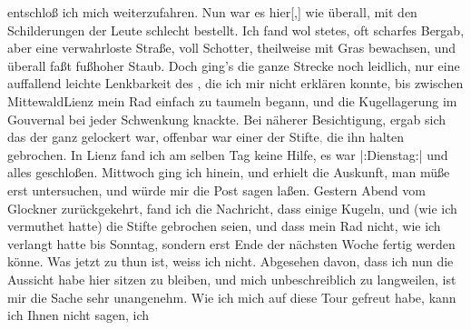                entschloß ich mich weiterzufahren. Nun war es hier{[},{]}{ }{\pb}wie überall, mit den
               Schilderungen der Leute schlecht bestellt. Ich fand wol stetes, oft scharfes Bergab,
               aber eine verwahrloste Straße, voll Schotter, theilweise mit Gras bewachsen, und
               überall faßt fußhoher Staub. Doch ging’s die ganze Strecke noch leidlich, nur eine
               auffallend leichte Lenkbarkeit des \label{K_L03128-2v}\label{K_L03128-2}, die
               ich mir nicht erklären konnte, bis zwischen MittewaldLienz mein Rad einfach zu taumeln begann, und die
               Kugellagerung im Gouvernal bei jeder Schwenkung knackte. Bei näherer Besichtigung,
               ergab sich das der \label{K_L03128-3v}\label{K_L03128-3} ganz gelockert
               war, offenbar war einer der Stifte\textcolor{gray}{,} die ihn halten gebrochen. In Lienz fand ich am selben Tag
               keine Hilfe, es war |:Dienstag:| \label{K_L03128-4v}\label{K_L03128-4} und alles geschloßen. Mittwoch ging ich hinein, und erhielt die Auskunft, man
               müße erst untersuchen, und würde mir die Post sagen laßen. Gestern{ }Abend vom Glockner zurückgekehrt,
               fand ich die Nachricht, dass einige Kugeln, und (wie ich vermuthet hatte) die Stifte
               gebrochen seien, und dass mein Rad nicht, wie ich {\pb}verlangt hatte bis Sonntag, sondern erst Ende der nächsten Woche fertig
               werden könne. Was jetzt zu thun ist, weiss ich nicht. Abgesehen davon, dass ich nun
               die Aussicht habe hier sitzen zu bleiben, und mich unbeschreiblich zu langweilen, ist
               mir die Sache \label{K_L03128-5v}\label{K_L03128-5} sehr
               unangenehm. Wie ich mich auf diese Tour gefreut habe, kann ich Ihnen nicht sagen, ich
